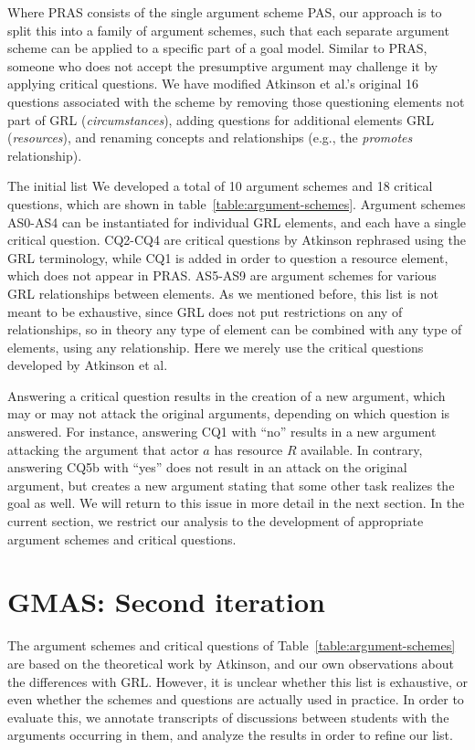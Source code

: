\documentclass[11.5pt,two column]{llncs}
\begin{document}
Where PRAS consists of the single argument scheme PAS, our approach is to split this into a family of argument schemes, such that each separate argument scheme can be applied to a specific part of a goal model. Similar to PRAS, someone who does not accept the presumptive argument may challenge it by applying critical questions. We have modified Atkinson et al.'s original 16 questions associated with the scheme \cite{atkinson2006argumentation} by removing those questioning elements not part of GRL (\emph{circumstances}), adding questions for additional elements GRL (\emph{resources}), and renaming concepts and relationships (e.g., the \emph{promotes} relationship).

The initial list We developed a total of 10 argument schemes and 18 critical questions, which are shown in table~\ref{table:argument-schemes}. Argument schemes AS0-AS4 can be instantiated for individual GRL elements, and each have a single critical question. CQ2-CQ4 are critical questions by Atkinson rephrased using the GRL terminology, while CQ1 is added in order to question a resource element, which does not appear in PRAS. AS5-AS9 are argument schemes for various GRL relationships between elements. As we mentioned before, this list is not meant to be exhaustive, since GRL does not put restrictions on any of relationships, so in theory any type of element can be combined with any type of elements, using any relationship. Here we merely use the critical questions developed by Atkinson et al.
 
Answering a critical question results in the creation of a new argument, which may or may not attack the original arguments, depending on which question is answered. For instance, answering CQ1 with ``no'' results in a new argument attacking the argument that actor $a$ has resource $R$ available. In contrary, answering CQ5b with ``yes'' does not result in an attack on the original argument, but creates a new argument stating that some other task realizes the goal as well. We will return to this issue in more detail in the next section. In the current section, we restrict our analysis to the development of appropriate argument schemes and critical questions.

\section{GMAS: Second iteration}
\label{sect:gmas:2}

The argument schemes and critical questions of Table~\ref{table:argument-schemes} are based on the theoretical work by Atkinson, and our own observations about the differences with GRL. However, it is unclear whether this list is exhaustive, or even whether the schemes and questions are actually used in practice. In order to evaluate this, we annotate transcripts of discussions between students with the arguments occurring in them, and analyze the results in order to refine our list.
\end{document}
